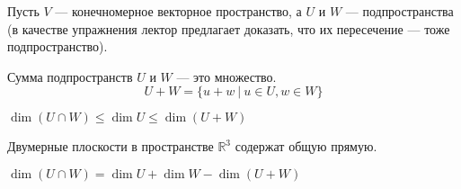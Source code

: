 Пусть $V$ --- конечномерное векторное пространство, а $U$ и $W$ --- подпространства (в качестве упражнения лектор предлагает доказать, что их пересечение --- тоже подпространство).

\begin{Def}
Сумма подпространств $U$ и $W$ --- это множество.
\[
U+W = \{u + w\ |\ u \in U, w \in W\}
\]
\end{Def}

\begin{Comment}
$\dim \left( U \cap W \right) \leqslant \dim U \leqslant \dim \left(U + W\right)$
\end{Comment}

\begin{Examples}
Двумерные плоскости в пространстве $\mathbb{R}^3$ содержат общую прямую.
\end{Examples}

\begin{Theorem}
$\dim \left(U \cap W\right) = \dim U + \dim W - \dim \left(U+W\right)$
\end{Theorem}

